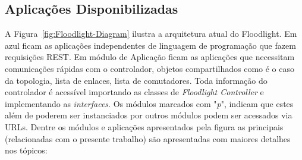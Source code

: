 \subsection{Aplicações Disponibilizadas}
\label{sub:mecanismo}

A Figura~\ref{fig:Floodlight-Diagram} ilustra a arquitetura atual do Floodlight. Em azul ficam as aplicações independentes de linguagem de programação que fazem requisições REST. Em módulo de Aplicação ficam as aplicações que necessitam comunicações rápidas com o controlador, objetos compartilhados como é o caso da topologia, lista de enlaces, lista de comutadores. Toda informação do controlador é acessível importando as classes de \textit{Floodlight Controller} e implementando as \textit{interfaces}. Os módulos marcados com "\textit{p}", indicam que estes além de poderem ser instanciados por outros módulos podem ser acessados via URLs.
Dentre os módulos e aplicações apresentados pela figura as principais (relacionadas com o presente trabalho) são apresentadas com maiores detalhes nos tópicos:

